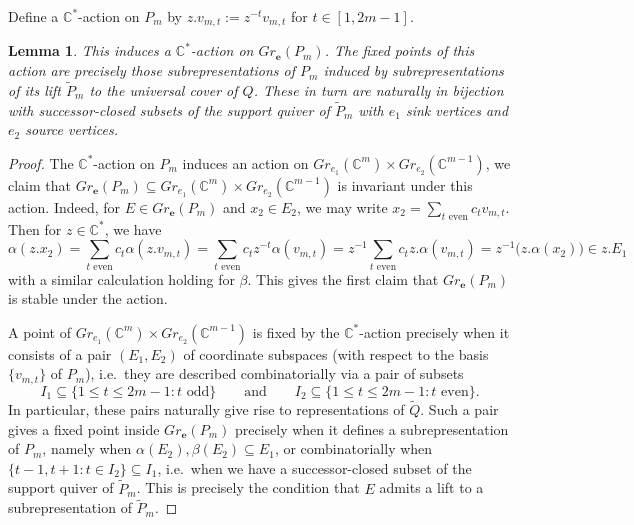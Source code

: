 \documentclass{amsart}
\newtheorem{lemma}[theorem]{Lemma}
\numberwithin{equation}{section}
\newcommand{\CC}{\mathbb{C}}
\newcommand{\bfe}{\mathbf{e}}
\begin{document}
    Define a $\CC^*$-action on $P_m$ by $z.v_{m,t}:=z^{-t}v_{m,t}$ for $t\in[1,2m-1]$.
    \begin{lemma}
      This induces a $\CC^*$-action on $Gr_\bfe(P_m)$.
      The fixed points of this action are precisely those subrepresentations of $P_m$ induced by subrepresentations of its lift $\widetilde P_m$ to the universal cover of $Q$.
      These in turn are naturally in bijection with successor-closed subsets of the support quiver of $\widetilde P_m$ with $e_1$ sink vertices and $e_2$ source vertices.
    \end{lemma}
    \begin{proof}
      The $\CC^*$-action on $P_m$ induces an action on $Gr_{e_1}(\CC^m)\times Gr_{e_2}(\CC^{m-1})$, we claim that $Gr_\bfe(P_m)\subseteq Gr_{e_1}(\CC^m)\times Gr_{e_2}(\CC^{m-1})$ is invariant under this action.
      Indeed, for $E\in Gr_\bfe(P_m)$ and $x_2\in E_2$, we may write $x_2=\sum\limits_{\text{$t$ even}} c_t v_{m,t}$.
      Then for $z\in\CC^*$, we have
      \[\alpha(z.x_2)=\sum\limits_{\text{$t$ even}} c_t \alpha(z.v_{m,t})=\sum\limits_{\text{$t$ even}} c_t z^{-t}\alpha(v_{m,t})=z^{-1}\sum\limits_{\text{$t$ even}} c_t z.\alpha(v_{m,t})=z^{-1} \big(z.\alpha(x_2)\big)\in z.E_1\]
      with a similar calculation holding for $\beta$.
      This gives the first claim that $Gr_\bfe(P_m)$ is stable under the action.

      A point of $Gr_{e_1}(\CC^m)\times Gr_{e_2}(\CC^{m-1})$ is fixed by the $\CC^*$-action precisely when it consists of a pair $(E_1,E_2)$ of coordinate subspaces (with respect to the basis $\{v_{m,t}\}$ of $P_m$), i.e.\ they are described combinatorially via a pair of subsets 
      \[I_1\subseteq\{1\le t\le 2m-1:\text{$t$ odd}\} \qquad \text{and} \qquad I_2\subseteq\{1\le t\le 2m-1:\text{$t$ even}\}.\]
      In particular, these pairs naturally give rise to representations of $\widetilde Q$.
      Such a pair gives a fixed point inside $Gr_\bfe(P_m)$ precisely when it defines a subrepresentation of $P_m$, namely when $\alpha(E_2),\beta(E_2)\subseteq E_1$, or combinatorially when $\{t-1,t+1:t\in I_2\}\subseteq I_1$, i.e.\ when we have a successor-closed subset of the support quiver of $\widetilde P_m$.
      This is precisely the condition that $E$ admits a lift to a subrepresentation of $\widetilde P_m$.
    \end{proof}
\end{document}
